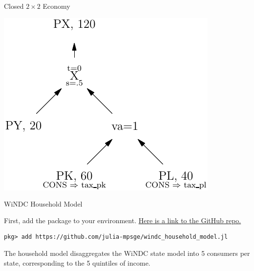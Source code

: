 \documentclass{beamer}
\begin{document}
\begin{frame}{Closed $2\times 2$ Economy}
    \begin{minipage}{.95\textwidth}
        \centering
        \includegraphics[width=\textwidth]{images/x_sector.pdf}
    \end{minipage}
\end{frame}


\begin{frame}[fragile]{WiNDC Household Model}

    First, add the package to your environment. \href{https://github.com/julia-mpsge/windc_household_model.jl}{Here is a link to the GitHub repo.}

    \begin{verbatim}
pkg> add https://github.com/julia-mpsge/windc_household_model.jl
    \end{verbatim}


    The household model disaggregates the WiNDC state model into 5 consumers per state, corresponding to the 5 quintiles of income. 

\end{frame}
\end{document}
